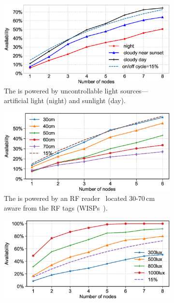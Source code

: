 \begin{figure}[h]
        \begin{subfigure}{.66\columnwidth}
            \includegraphics[width=\textwidth]{figures/sysAvailability}
                \caption{The \cis is powered by uncontrollable light sources---artificial light (night) and sunlight (day).}
            \label{fig:solarPwrCIS}
        \end{subfigure}\hfill
        \begin{subfigure}{.66\columnwidth}
            \includegraphics[width=\textwidth]{figures/rf_sysAvailability}
                \caption{The \cis is powered by an RF reader~\cite{r420_website} located 30-70\,cm aware from the RF tags (WISPs~\cite{smith2006wirelessly}).}
            \label{fig:rfPwrCIS}
        \end{subfigure}\hfill
        \begin{subfigure}{.66\columnwidth}
            \includegraphics[width=\textwidth]{figures/sysAvailability_artificial-light}

\end{subfigure}
\end{figure}
